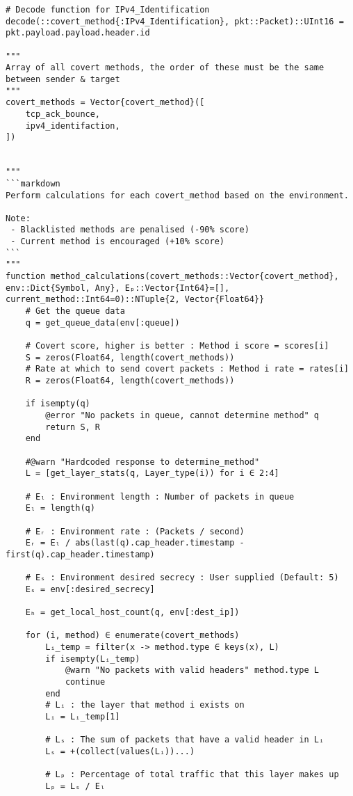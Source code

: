 \begin{lstlisting}[language=JuliaLocal, style=julia]
# Decode function for IPv4_Identification
decode(::covert_method{:IPv4_Identification}, pkt::Packet)::UInt16 = pkt.payload.payload.header.id

"""
Array of all covert methods, the order of these must be the same between sender & target
"""
covert_methods = Vector{covert_method}([
    tcp_ack_bounce,
    ipv4_identifaction,
])


"""
```markdown
Perform calculations for each covert_method based on the environment.

Note:
 - Blacklisted methods are penalised (-90% score)
 - Current method is encouraged (+10% score)
```
"""
function method_calculations(covert_methods::Vector{covert_method}, env::Dict{Symbol, Any}, Eₚ::Vector{Int64}=[], current_method::Int64=0)::NTuple{2, Vector{Float64}}
    # Get the queue data
    q = get_queue_data(env[:queue])

    # Covert score, higher is better : Method i score = scores[i]
    S = zeros(Float64, length(covert_methods))
    # Rate at which to send covert packets : Method i rate = rates[i]
    R = zeros(Float64, length(covert_methods))
    
    if isempty(q)
        @error "No packets in queue, cannot determine method" q
        return S, R
    end
    
    #@warn "Hardcoded response to determine_method"
    L = [get_layer_stats(q, Layer_type(i)) for i ∈ 2:4]

    # Eₗ : Environment length : Number of packets in queue
    Eₗ = length(q)

    # Eᵣ : Environment rate : (Packets / second)
    Eᵣ = Eₗ / abs(last(q).cap_header.timestamp - first(q).cap_header.timestamp)

    # Eₛ : Environment desired secrecy : User supplied (Default: 5)
    Eₛ = env[:desired_secrecy]

    Eₕ = get_local_host_count(q, env[:dest_ip])

    for (i, method) ∈ enumerate(covert_methods)
        Lᵢ_temp = filter(x -> method.type ∈ keys(x), L)
        if isempty(Lᵢ_temp)
            @warn "No packets with valid headers" method.type L
            continue
        end
        # Lᵢ : the layer that method i exists on
        Lᵢ = Lᵢ_temp[1]

        # Lₛ : The sum of packets that have a valid header in Lᵢ
        Lₛ = +(collect(values(Lᵢ))...)

        # Lₚ : Percentage of total traffic that this layer makes up
        Lₚ = Lₛ / Eₗ


\end{lstlisting}
